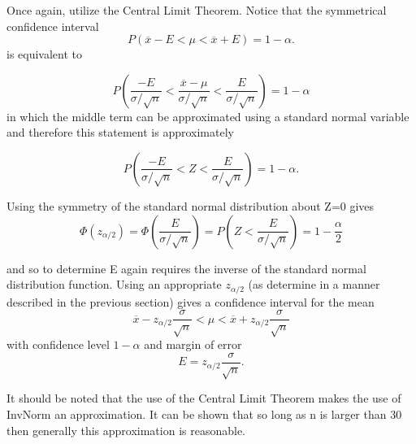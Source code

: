 \documentclass[10pt,]{book}
\theoremstyle{plain}
\theoremstyle{definition}
\theoremstyle{definition}
\theoremstyle{definition}
\numberwithin{equation}{section}
\newcommand{\lt}{ < }
\begin{document}
Once again, utilize the Central Limit Theorem.  Notice that the symmetrical confidence interval 
\begin{equation*}P(\overline{x} - E \lt \mu \lt \overline{x} + E) = 1-\alpha.\end{equation*}
is equivalent to

\begin{equation*}P \left ( \frac{-E}{\sigma / \sqrt{n}} \lt \frac{\overline{x} - \mu}{\sigma / \sqrt{n}} \lt \frac{E}{\sigma / \sqrt{n}} \right ) = 1 - \alpha\end{equation*}
in which the middle term can be approximated using a standard normal variable and therefore this statement is approximately

\begin{equation*}P \left ( \frac{-E}{\sigma / \sqrt{n}} \lt Z \lt \frac{E}{\sigma / \sqrt{n}} \right ) = 1 - \alpha.\end{equation*}

Using the symmetry of the standard normal distribution about Z=0 gives
\begin{equation*}\Phi (z_{\alpha/2} ) = \Phi \left ( \frac{E}{\sigma / \sqrt{n}} \right ) = P \left ( Z \lt \frac{E}{\sigma / \sqrt{n}} \right ) = 1 - \frac{\alpha}{2}\end{equation*}

and so to determine E again requires the inverse of the standard normal distribution function.  Using an appropriate \(z_{\alpha /2}\) (as determine in a manner described in the previous section) gives a confidence interval for the mean
\begin{equation*}\overline{x} - z_{\alpha / 2} \frac{\sigma}{\sqrt{n}} \lt \mu \lt \overline{x} + z_{\alpha / 2} \frac{\sigma}{\sqrt{n}}\end{equation*}
with confidence level \(1-\alpha\) and margin of error 
\begin{equation*}E = z_{\alpha /2} \frac{\sigma}{\sqrt{n}}.\end{equation*}
%
\par

It should be noted that the use of the Central Limit Theorem makes the use of  InvNorm an approximation. It can be shown that so long as n is larger than 30 then generally this approximation is reasonable.
%
\par
\end{document}

